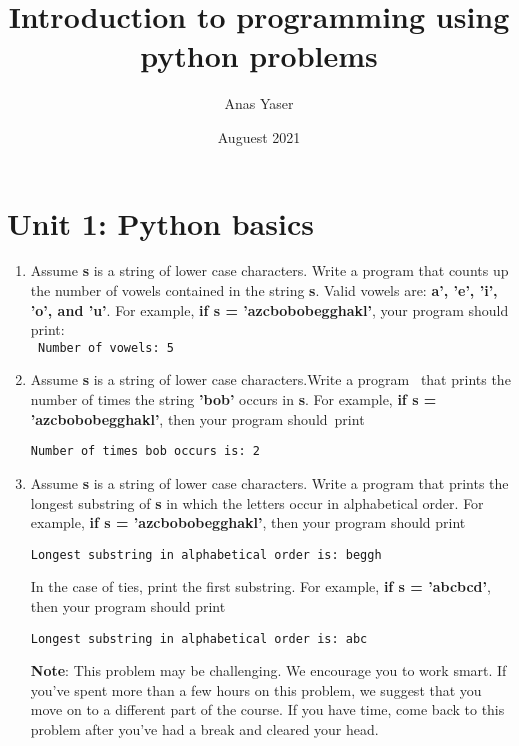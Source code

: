 \documentclass{article}
\title{Introduction to programming using python problems}
\date{Auguest 2021}
\author{Anas Yaser}
\begin{document}
\maketitle
\pagebreak
\tableofcontents
\pagebreak

{}
\section*{Unit 1: Python basics}

\begin{enumerate}

  \item Assume \textbf{s} is a string of lower case characters. Write a program
    that counts up the number of vowels contained in the string \textbf{s}. Valid
    vowels are: \textbf{a', 'e', 'i', 'o', and 'u'}. For example,
    \textbf{if s = 'azcbobobegghakl'}, your program should print:\\
    \verb| Number of vowels: 5|

  \item Assume \textbf{s} is a string of lower case characters.Write a program \
    that prints the number of times the string \textbf{'bob'} occurs in \textbf{s}.
    For example, \textbf{if s = 'azcbobobegghakl'}, then your program should\
    print

    \verb|Number of times bob occurs is: 2|

  \item Assume \textbf{s} is a string of lower case characters. Write a program
    that prints the longest substring of \textbf{s} in which the letters occur
    in alphabetical order. For example, \textbf{if s = 'azcbobobegghakl'}, then
    your program should print

    \verb|Longest substring in alphabetical order is: beggh|

    In the case of ties, print the first substring. For example, \textbf{if s = 'abcbcd'},
    then your program should print

    \verb|Longest substring in alphabetical order is: abc|

    \textbf{Note}: This problem may be challenging. We encourage you to work smart. If
    you've spent more than a few hours on this problem, we suggest that you move
    on to a different part of the course. If you have time, come back to this
    problem after you've had a break and cleared your head.

\end{enumerate}
\end{document}
